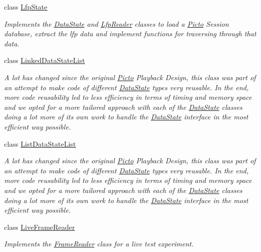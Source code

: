 \begin{DoxyCompactItemize}
class \hyperlink{class_picto_1_1_lfp_state}{Lfp\-State}
\begin{DoxyCompactList}\small\item\em Implements the \hyperlink{class_picto_1_1_data_state}{Data\-State} and \hyperlink{class_picto_1_1_lfp_reader}{Lfp\-Reader} classes to load a \hyperlink{namespace_picto}{Picto} Session database, extract the lfp data and implement functions for traversing through that data. \end{DoxyCompactList}\item 
class \hyperlink{class_picto_1_1_linked_data_state_list}{Linked\-Data\-State\-List}
\begin{DoxyCompactList}\small\item\em A lot has changed since the original \hyperlink{namespace_picto}{Picto} Playback Design, this class was part of an attempt to make code of different \hyperlink{class_picto_1_1_data_state}{Data\-State} types very reusable. In the end, more code reusability led to less efficiency in terms of timing and memory space and we opted for a more tailored approach with each of the \hyperlink{class_picto_1_1_data_state}{Data\-State} classes doing a lot more of its own work to handle the \hyperlink{class_picto_1_1_data_state}{Data\-State} interface in the most efficient way possible. \end{DoxyCompactList}\item 
class \hyperlink{class_picto_1_1_list_data_state_list}{List\-Data\-State\-List}
\begin{DoxyCompactList}\small\item\em A lot has changed since the original \hyperlink{namespace_picto}{Picto} Playback Design, this class was part of an attempt to make code of different \hyperlink{class_picto_1_1_data_state}{Data\-State} types very reusable. In the end, more code reusability led to less efficiency in terms of timing and memory space and we opted for a more tailored approach with each of the \hyperlink{class_picto_1_1_data_state}{Data\-State} classes doing a lot more of its own work to handle the \hyperlink{class_picto_1_1_data_state}{Data\-State} interface in the most efficient way possible. \end{DoxyCompactList}\item 
class \hyperlink{class_picto_1_1_live_frame_reader}{Live\-Frame\-Reader}
\begin{DoxyCompactList}\small\item\em Implements the \hyperlink{class_picto_1_1_frame_reader}{Frame\-Reader} class for a live test experiment. \end{DoxyCompactList}\item 

\end{DoxyCompactItemize}
